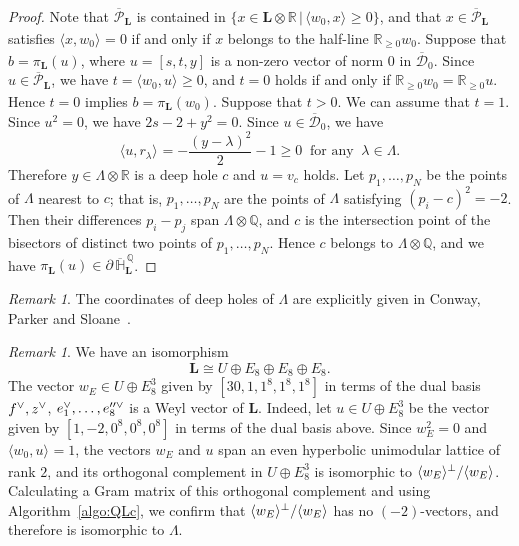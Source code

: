 \documentclass{amsart}
\theoremstyle{plain}
\theoremstyle{definition}
\theoremstyle{remark}
\newtheorem{remark}[theorem]{Remark}
\numberwithin{equation}{section}
\numberwithin{table}{section}
\numberwithin{figure}{section}
\renewcommand{\H}{\mathord{\mathbb H}}
\newcommand{\Q}{\mathord{\mathbb  Q}}
\newcommand{\R}{\mathord{\mathbb R}}
\newcommand{\DDD}{\mathord{\mathcal D}}
\newcommand{\PPP}{\mathord{\mathcal P}}
\newcommand{\shortset}[2]{\{ {#1} \,|\, {#2}   \}}
\newcommand{\gen}[1]{\langle {#1}  \rangle}
\newcommand{\tensor}{\otimes}
\newcommand{\sperp}{\sp{\perp}}
\newcommand{\dual}{\sp{\vee}}
\newcommand{\bdr}{\partial\,}
\newcommand{\closure}[1]{\overline{#1}}
\renewcommand{\L}{\mathord{\mathbf{L}}}
\newcommand{\intM}[2]{\langle{#1}\rangle_{#2}}
\newcommand{\clPPP}{\overline{\PPP}}
\newcommand{\clH}{\overline{\H}}
\newcommand{\bdrclHQ}{\bdr\clH^{\,\Q}}
\begin{document}
\begin{proof}
Note that $\clPPP_{\L}$ is contained in $\shortset{x\in \L\tensor\R}{\intM{w_0, x}{}\ge 0}$,
and that $x\in \clPPP_{\L}$
satisfies $\intM{x, w_0}{}=0$ if and only if $x$ belongs to the half-line $\R_{\ge 0} w_0$.
Suppose that $b=\pi_{\L}(u)$,
where $u=[s, t, y]$ is a non-zero vector of norm $0$
in   $\closure{\DDD}_0$.
Since $u\in \clPPP_{\L}$, we have $t=\intM{w_0, u}{}\ge 0$,
and $t=0$ holds if and only if $\R_{\ge 0} w_0= \R_{\ge 0} u$.
Hence $t=0$ implies $b=\pi_{\L}(w_0)$.
Suppose that $t>0$.
We can assume that $t=1$.
Since $u^2=0$, we have $2s-2+y^2=0$.
Since $u\in \closure{\DDD}_0$,
we have
$$
\intM{u, r_{\lambda}}{}=-\frac{(y-\lambda)^2}{2}-1\ge 0\;\;\textrm{for any}\;\; \lambda\in \Lambda.
$$
Therefore $y\in \Lambda\tensor\R$ is a deep hole $c$ and $u=v_c$ holds.
Let $p_1, \dots, p_N$ be the points of $\Lambda$ nearest to $c$;
that is, $p_1, \dots, p_N$  are the points of $\Lambda$ satisfying  $(p_i-c)^2=-2$.
Then their differences $p_i-p_j$ span $\Lambda\tensor\Q$,
and $c$ is the intersection point of the bisectors of
distinct  two points of $p_1, \dots, p_N$.
Hence $c$ belongs to  $\Lambda\tensor\Q$, and we have   $\pi_{\L}(u)\in \bdrclHQ_{\L}$.
%
\end{proof}
%
\begin{remark}\label{rem:deepholes}
The coordinates of  deep holes of $\Lambda$ are explicitly given  in 
 Conway, Parker and Sloane~\cite{MR660415}.
\end{remark}
%
\begin{remark}\label{rem:UE83}
We have an isomorphism 
$$
\L\cong  U\oplus E_8 \oplus E_8 \oplus E_8.
$$
The vector $w_E\in U\oplus E_8^3$ given by
$[30, 1, 1^8, 1^8, 1^8]$ 
in terms of the dual basis $f\dual, z\dual$, $e_1\dual, \dots, e_8^{\prime\prime\vee}$
is a Weyl vector of $\L$.
Indeed, let $u\in U\oplus E_8^3$ be the vector given by
$[1, -2, 0^8, 0^8, 0^8]$ 
in terms of the dual basis above.
Since $w_E^2=0$ and $\intM{w_0, u}{}=1$,
the vectors $w_E$ and $u$ span an even  hyperbolic unimodular lattice of rank $2$,
and its orthogonal complement  in $U\oplus E_8^3$
is isomorphic to $\gen{w_E}\sperp/\gen{w_E}$.
Calculating a Gram matrix of this orthogonal complement 
and using Algorithm~\ref{algo:QLc}, we  confirm that $\gen{w_E}\sperp/\gen{w_E}$ has no $(-2)$-vectors,
and therefore is isomorphic to $\Lambda$.
\end{remark}
%
%  
\end{document}
